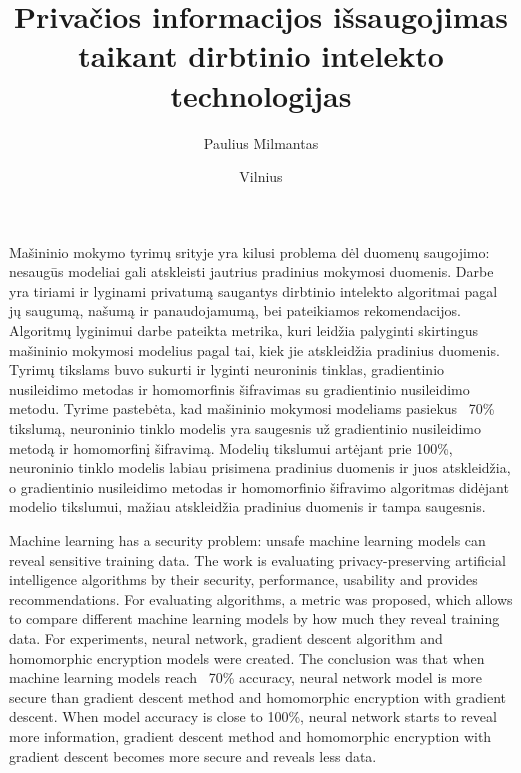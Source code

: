 \documentclass{VUMIFInfBakalaurinis}
\title{Privačios informacijos išsaugojimas taikant dirbtinio intelekto technologijas}
\author{Paulius Milmantas}
\date{Vilnius \\ \the\year}
\begin{document}
\maketitle

\tableofcontents

Mašininio mokymo tyrimų srityje yra kilusi problema dėl duomenų saugojimo: nesaugūs modeliai gali atskleisti jautrius pradinius mokymosi duomenis. Darbe yra tiriami ir lyginami privatumą saugantys dirbtinio intelekto algoritmai pagal jų saugumą, našumą ir panaudojamumą, bei pateikiamos rekomendacijos. Algoritmų lyginimui darbe pateikta metrika, kuri leidžia palyginti skirtingus mašininio mokymosi modelius pagal tai, kiek jie atskleidžia pradinius duomenis. Tyrimų tikslams buvo sukurti ir lyginti  neuroninis tinklas, gradientinio nusileidimo metodas ir homomorfinis šifravimas su gradientinio nusileidimo metodu. Tyrime pastebėta, kad mašininio mokymosi modeliams pasiekus ~70\% tikslumą,  neuroninio tinklo modelis yra saugesnis už gradientinio nusileidimo metodą ir homomorfinį šifravimą. Modelių tikslumui artėjant prie 100\%,  neuroninio tinklo modelis labiau prisimena pradinius duomenis ir juos atskleidžia, o gradientinio nusileidimo metodas ir homomorfinio šifravimo algoritmas didėjant modelio tikslumui, mažiau atskleidžia pradinius duomenis ir tampa saugesnis.


Machine learning has a security problem: unsafe machine learning models can reveal sensitive training data. The work is evaluating privacy-preserving artificial intelligence algorithms by their security, performance, usability and provides recommendations. For evaluating algorithms, a metric was proposed, which allows to compare different machine learning models by how much they reveal training data. For experiments,  neural network, gradient descent algorithm and homomorphic encryption models were created. The conclusion was that when machine learning models reach ~70\% accuracy,  neural network model is more secure than gradient descent method and homomorphic encryption with gradient descent. When model accuracy is close to 100\%,  neural network starts to reveal more information, gradient descent method and homomorphic encryption with gradient descent becomes more secure and reveals less data.
\end{document}
